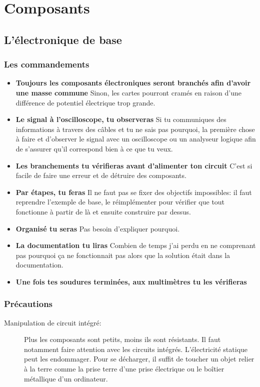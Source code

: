 \documentclass[a4paper, 11pt]{report}
\begin{document}
\part{Composants}

\chapter{L'électronique de base}

\section{Les commandements}
\begin{itemize}
\item \textbf{Toujours les composants électroniques seront branchés afin d'avoir une masse commune}
Sinon, les cartes pourront cramés en raison d'une différence de potentiel électrique trop grande.
\item \textbf{Le signal à l'oscilloscope, tu observeras}
Si tu communiques des informations à travers des câbles et tu ne sais pas pourquoi, la première chose à faire et d'observer le signal avec un oscilloscope ou un analyseur logique afin de s'assurer qu'il correspond bien à ce que tu veux.
\item \textbf{Les branchements tu vérifieras avant d'alimenter ton circuit}
C'est si facile de faire une erreur et de détruire des composants.
\item \textbf{Par étapes, tu feras}
Il ne faut pas se fixer des objectifs impossibles: il faut reprendre l'exemple de base, le réimplémenter pour vérifier que tout fonctionne à partir de là et ensuite construire par dessus.
\item \textbf{Organisé tu seras}
Pas besoin d'expliquer pourquoi.
\item \textbf{La documentation tu liras}
Combien de temps j'ai perdu en ne comprenant pas pourquoi ça ne fonctionnait pas alors que la solution était dans la documentation.
\item \textbf{Une fois tes soudures terminées, aux multimètres tu les vérifieras}
\end{itemize}

\section{Précautions}
\begin{description}
\item[Manipulation de circuit intégré:] Plus les composants sont petits, moins ils sont résistants. Il faut notamment faire attention avec les circuits intégrés. L'électricité statique peut les endommager. Pour se décharger, il suffit de toucher un objet relier à la terre comme la prise terre d'une prise électrique ou le boîtier métallique d'un ordinateur.
\end{description}
\end{document}
